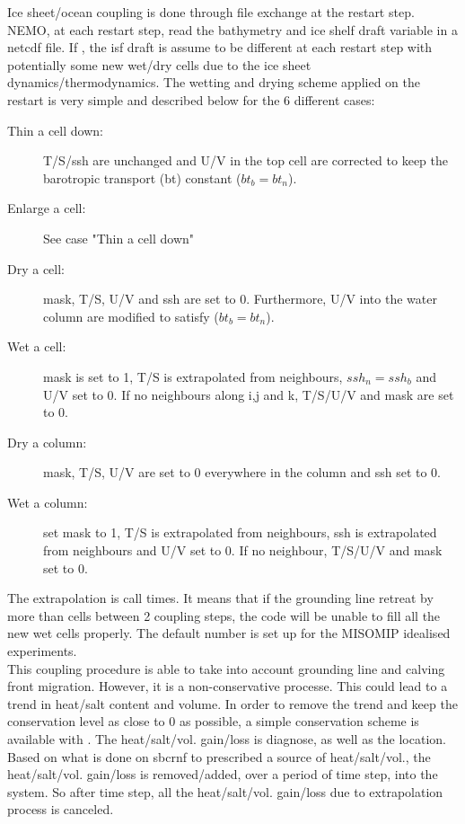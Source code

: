 \documentclass[../tex_main/NEMO_manual]{subfiles}
\begin{document}
Ice sheet/ocean coupling is done through file exchange at the restart step.
NEMO, at each restart step, read the bathymetry and ice shelf draft variable in a netcdf file.
If , the isf draft is assume to be different at each restart step with
potentially some new wet/dry cells due to the ice sheet dynamics/thermodynamics.
The wetting and drying scheme applied on the restart is very simple and described below for the 6 different cases:
\begin{description}
\item[Thin a cell down:]
  T/S/ssh are unchanged and U/V in the top cell are corrected to keep the barotropic transport (bt) constant
  ($bt_b=bt_n$).
\item[Enlarge  a cell:]
  See case "Thin a cell down"
\item[Dry a cell:]
  mask, T/S, U/V and ssh are set to 0.
  Furthermore, U/V into the water column are modified to satisfy ($bt_b=bt_n$).
\item[Wet a cell:] 
  mask is set to 1, T/S is extrapolated from neighbours, $ssh_n = ssh_b$ and U/V set to 0.
  If no neighbours along i,j and k, T/S/U/V and mask are set to 0.
\item[Dry a column:]
	mask, T/S, U/V are set to 0 everywhere in the column and ssh set to 0.
\item[Wet a column:]
  set mask to 1, T/S is extrapolated from neighbours, ssh is extrapolated from neighbours and U/V set to 0.
  If no neighbour, T/S/U/V and mask set to 0.
\end{description}
The extrapolation is call  times.
It means that if the grounding line retreat by more than  cells between 2 coupling steps,
the code will be unable to fill all the new wet cells properly.
The default number is set up for the MISOMIP idealised experiments.\\
This coupling procedure is able to take into account grounding line and calving front migration.
However, it is a non-conservative processe. 
This could lead to a trend in heat/salt content and volume.
In order to remove the trend and keep the conservation level as close to 0 as possible,
a simple conservation scheme is available with .
The heat/salt/vol. gain/loss is diagnose, as well as the location.
Based on what is done on sbcrnf to prescribed a source of heat/salt/vol.,
the heat/salt/vol. gain/loss is removed/added, over a period of  time step, into the system. 
So after  time step, all the heat/salt/vol. gain/loss due to extrapolation process is canceled.\\
\end{document}
